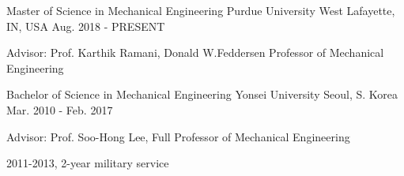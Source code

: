 


\begin{cventries}


    \cventry
    {Master of Science in Mechanical Engineering} %
    {Purdue University} %
    {West Lafayette, IN, USA} %
    {Aug. 2018 - PRESENT} %
    { %
    \begin{cvitems}
        \item {Advisor: Prof. Karthik Ramani, Donald W.Feddersen Professor of Mechanical Engineering}
    \end{cvitems}
    }

    \cventry
    {Bachelor of Science in Mechanical Engineering} %
    {Yonsei University} %
    {Seoul, S. Korea} %
    {Mar. 2010 - Feb. 2017} %
    { %
    \begin{cvitems}
        \item {Advisor: Prof. Soo-Hong Lee, Full Professor of Mechanical Engineering}
        \item {2011-2013, 2-year military service}
    \end{cvitems}
    }

\end{cventries}
